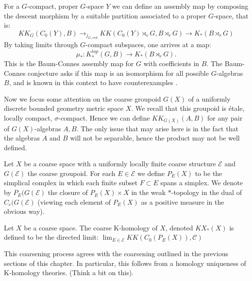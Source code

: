 \begin{remark}
For a $G$-compact, proper $G$-space $Y$ we can define an assembly map by composing the descent morphism by a suitable partition associated to a proper $G$-space, that is:
\begin{equation*}
KK_{G}(C_{0}(Y),B) \rightarrow_{j_{G,red}} KK(C_{0}(Y)\rtimes_{r}G, B\rtimes_{r} G) \rightarrow K_{*}(B\rtimes_{r}G)
\end{equation*}
By taking limits through $G$-compact subspaces, one arrives at a map:
\begin{equation*}
\mu_{*}:K^{top}_{*}(G,B)\rightarrow K_{*}(B\rtimes_{r}G).
\end{equation*}
This is the Baum-Connes assembly map for $G$ with coefficients in $B$. The Baum-Connes conjecture asks if this map is an isomorphism for all possible $G$-algebras $B$, and is known in this context to have counterexamples \cite{MR1911663}.
\end{remark}

Now we focus some attention on the coarse groupoid $G(X)$ of a uniformly discrete bounded geometry metric space $X$. We recall that this groupoid is \'etale, locally compact, $\sigma$-compact. Hence we can define $KK_{G(X)}(A,B)$ for any pair of $G(X)$-algebras $A,B$. The only issue that may arise here is in the fact that the algebras $A$ and $B$ will not be separable, hence the product may not be well defined.


\begin{definition}
Let $X$ be a coarse space with a uniformly locally finite coarse structure $\mathcal{E}$ and $G(\mathcal{E})$ the coarse groupoid. For each $E \in \mathcal{E}$ we define $P_{E}(X)$ to be the simplical complex in which each finite subset $F \subset E$ spans a simplex. We denote by $P_{E}(G(\mathcal{E})$ the closure of $P_{E}(X)\times X$ in the weak $*$-topology in the dual of $C_{c}(G(\mathcal{E})$ (viewing each element of $P_{E}(X)$ as a positive measure in the obvious way).
\end{definition}

\begin{definition}
Let $X$ be a coarse space. The coarse K-homology of $X$, denoted $KX_{*}(X)$ is defined to be the directed limit: $\lim_{E \in \mathcal{E}}KK(C_{0}(P_{E}(X)),\mathcal{C})$
\end{definition}

\begin{remark}
This coarsening process agrees with the coarsening outlined in the previous sections of this chapter. In particular, this follows from a homology uniqueness of K-homology theories. (Think a bit on this).
\end{remark}

